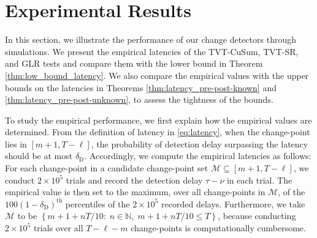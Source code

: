 \documentclass[12pt]{interact}
\newcommand{\lp}{\left(}
\newcommand{\rp}{\right)}
\newcommand{\lb}{\left[}
\newcommand{\rb}{\right]}
\newcommand{\lbp}{\left\{}
\newcommand{\rbp}{\right\}}
\newcommand{\mcal}{\mathcal}
\newcommand{\mrm}{\mathrm}
\newcommand{\mbb}{\mathbb}
\theoremstyle{plain}
\newcommand{\yhh}[1]{{\color{purple}{#1}}}
\begin{document}
\section{Experimental Results}
\label{sec:sim}

In this section, we illustrate the performance of our change detectors through simulations. We present the empirical latencies of the TVT-CuSum, TVT-SR, and GLR tests and compare them with the lower bound in Theorem \ref{thm:low_bound_latency}. We also compare the empirical values with the upper bounds on the latencies in Theorems \ref{thm:latency_pre-post-known} and \ref{thm:latency_pre-post-unknown}, to assess the tightness of the bounds. 

To study the empirical performance, we first explain how the empirical values are determined. From the definition of latency in \eqref{eq:latency}, when the change-point lies in $\lb m+1, T-\ell \rb$, the probability of detection delay surpassing the latency should be at most $\delta_{\mrm{D}}$. Accordingly, we compute the empirical latencies as follows: For each change-point in a candidate change-point set $\mcal{M} \subseteq \lb m+1, T-\ell \rb$, we conduct $2\times10^{5}$ trials and record the detection delay $\tau - \nu$ in each trial. The empirical value is then set to the maximum, over all change-points in $\mcal{M}$, of the $100 \lp 1-\delta_{\mrm{D}} \rp^{\mrm{th}}$ percentiles of the $2\times10^{5}$ recorded delays. Furthermore, we take $\mcal{M}$ to be $\lbp m+1+nT/10 :\; n \in \mbb{N},\; m+1+nT/10 \leq T \rbp$, because conducting $2\times10^5$ trials over all $T-\ell-m$ change-points is computationally cumbersome. 
\end{document}
